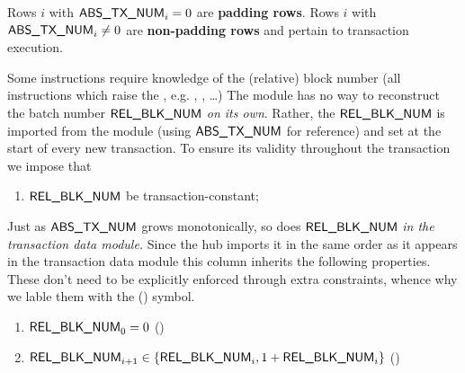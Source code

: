 Rows $i$ with $\textsf{ABS\_TX\_NUM}_{i} = 0$ are \textbf{padding rows}. Rows $i$ with $\textsf{ABS\_TX\_NUM}_{i} \neq 0$ are \textbf{non-padding rows} and pertain to transaction execution.

Some instructions require knowledge of the (relative) block number (all instructions which raise the \btcFlag{}, e.g. , , \dots{})
The \hubMod{} module has no way to reconstruct the batch number $\textsf{REL\_BLK\_NUM}$ \emph{on its own}.
Rather, the $\textsf{REL\_BLK\_NUM}$ is imported from the \txnDataMod{} module (using $\textsf{ABS\_TX\_NUM}$ for reference) and set at the start of every new transaction.
To ensure its validity throughout the transaction we impose that
\begin{enumerate}[resume]
	\item \label{hub: heartbeat: transaction constancy of relative block number} $\textsf{REL\_BLK\_NUM}$ be transaction-constant;
\end{enumerate}
Just as $\textsf{ABS\_TX\_NUM}$ grows monotonically, so does $\textsf{REL\_BLK\_NUM}$ \emph{in the transaction data module.}
Since the hub imports it in the same order as it appears in the transaction data module this column inherits the following properties.
These don't need to be explicitly enforced through extra constraints, whence why we lable them with the (\trash) symbol.
\begin{enumerate}[resume]
	\item $\textsf{REL\_BLK\_NUM}_{0} = 0$ \quad (\trash)
	\item $\textsf{REL\_BLK\_NUM}_{i + 1} \in \{ \textsf{REL\_BLK\_NUM}_{i}, 1 + \textsf{REL\_BLK\_NUM}_{i} \}$ \quad (\trash)
\end{enumerate}
